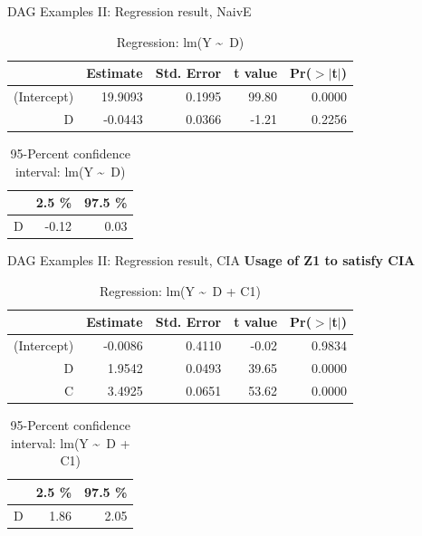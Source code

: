 \documentclass{beamer}\usepackage[]{graphicx}\usepackage[]{color}
\begin{document}
\begin{frame}[fragile]{DAG Examples II: Regression result, NaivE}
\begin{table}[ht]
\centering
\begingroup\small
\begin{tabular}{rrrrr}
  \hline
 & Estimate & Std. Error & t value & Pr($>$$|$t$|$) \\ 
  \hline
(Intercept) & 19.9093 & 0.1995 & 99.80 & 0.0000 \\ 
  D & -0.0443 & 0.0366 & -1.21 & 0.2256 \\ 
   \hline
\end{tabular}
\endgroup
\caption{Regression: lm(Y \textasciitilde ~D)} 
\end{table}
\begin{table}[ht]
\centering
\begingroup\small
\begin{tabular}{rrr}
  \hline
 & 2.5 \% & 97.5 \% \\ 
  \hline
D & -0.12 & 0.03 \\ 
   \hline
\end{tabular}
\endgroup
\caption{95-Percent confidence interval: lm(Y \textasciitilde ~D)} 
\end{table}

\end{frame}

\begin{frame}[fragile]{DAG Examples II: Regression result, CIA}
\textbf{Usage of Z1 to satisfy CIA}
\begin{table}[ht]
\centering
\begingroup\small
\begin{tabular}{rrrrr}
  \hline
 & Estimate & Std. Error & t value & Pr($>$$|$t$|$) \\ 
  \hline
(Intercept) & -0.0086 & 0.4110 & -0.02 & 0.9834 \\ 
  D & 1.9542 & 0.0493 & 39.65 & 0.0000 \\ 
  C & 3.4925 & 0.0651 & 53.62 & 0.0000 \\ 
   \hline
\end{tabular}
\endgroup
\caption{Regression: lm(Y \textasciitilde ~D + C1)} 
\end{table}
\begin{table}[ht]
\centering
\begingroup\small
\begin{tabular}{rrr}
  \hline
 & 2.5 \% & 97.5 \% \\ 
  \hline
D & 1.86 & 2.05 \\ 
   \hline
\end{tabular}
\endgroup
\caption{95-Percent confidence interval: lm(Y \textasciitilde ~D + C1)} 
\end{table}

\end{frame}
\end{document}
